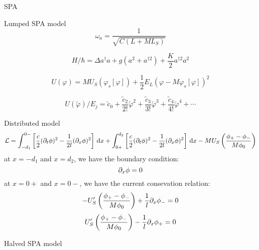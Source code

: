 \documentclass[12pt,a4paper]{article}
\begin{document}
\begin{section}{SPA}
\begin{subsection}{Lumped SPA model}
\begin{equation}\label{eq:lumped_omega_a}
\omega_a = \frac{1}{\sqrt{C(L+M L_S)}}
\end{equation}

\begin{equation}\label{eq:Hamiltonian}
H/\hbar = \Delta a^\dagger a + g \left( a^2 + a^{\dagger2} \right) + \frac{K}{2} a^{\dagger2} a^2
\end{equation}

\begin{equation}
U(\varphi) = M U_S (\varphi_s[\varphi]) + \frac{1}{2}E_L (\varphi - M \varphi_s[\varphi])^2
\end{equation}

\begin{equation}
U(\tilde{\varphi})/E_j = \tilde{c}_0 + \frac{\tilde{c}_2}{2!} \tilde{\varphi}^2 + \frac{\tilde{c}_3}{3!} \tilde{\varphi}^3 + \frac{\tilde{c}_4}{4!} \tilde{\varphi}^4 + \cdots
\end{equation}

\end{subsection}

\begin{subsection}{Distributed model}
\begin{equation}
\Lagrangian = \integral{\left[ \frac{c}{2}(\dt{\phi})^2 - \frac{1}{2l} (\dx{\phi})^2 \right]}{x}{-d_1}{0-} + \integral{\left[ \frac{c}{2}(\dt{\phi})^2 - \frac{1}{2l} (\dx{\phi})^2 \right]}{x}{0+}{d_2} - M U_S\left(\frac{\phi_+ - \phi_-}{M\phi_0}\right)
\end{equation}
at $x = -d_1$ and $x = d_2$, we have the boundary condition: 
\begin{equation}
\dx \phi = 0
\end{equation}
at $x = 0+$ and $x = 0-$, we have the current consevation relation: 
\begin{equation}
- U_S'\left(\frac{\phi_+ - \phi_-}{M \phi_0}\right) + \frac{1}{l}\dx\phi_- = 0
\end{equation}
\begin{equation}
U_S'\left(\frac{\phi_+ - \phi_-}{M \phi_0}\right) - \frac{1}{l}\dx\phi_+ = 0
\end{equation}

\end{subsection}

\begin{subsection}{Halved SPA model}


\end{subsection}
\end{section}
\end{document}
